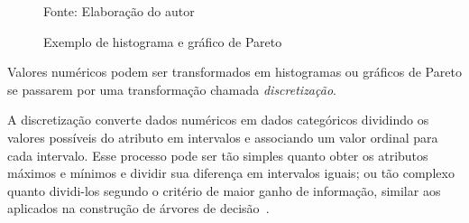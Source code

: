 \documentclass[12pt,a4paper]{article}
\newcommand{\source}[1]{\vspace{-10pt} \caption*{Fonte: {#1}} }
\begin{document}
\begin{figure}[ht]
  \centering
  \caption{Exemplo de histograma e gráfico de Pareto}
  \label{fig:exemplos-pareto-histograma}
  \source{Elaboração do autor}
\end{figure}

Valores numéricos podem ser transformados em histogramas ou gráficos de Pareto se passarem por uma transformação chamada \textit{discretização}.

A discretização converte dados numéricos em dados categóricos dividindo os valores possíveis do atributo em intervalos e associando um valor ordinal para cada intervalo. Esse processo pode ser tão simples quanto obter os atributos máximos e mínimos e dividir sua diferença em intervalos iguais; ou tão complexo quanto dividi-los segundo o critério de maior ganho de informação, similar aos aplicados na construção de árvores de decisão~\cite{Nunes2016}.
\end{document}
